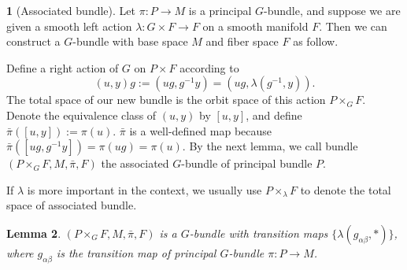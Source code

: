 \documentclass[11pt]{article}
\theoremstyle{definition}
\newtheorem{para}{}[part]
\theoremstyle{plain}
\newtheorem{lem}[para]{Lemma}
\begin{document}
\begin{para}[Associated bundle]\label{11}
	Let $\pi:P\to M$ is a principal $G$-bundle, and suppose we are given a smooth left action $\lambda:G\times F\to F$ on a smooth manifold $F$. Then we can construct a $G$-bundle with base space $M$ and fiber space $F$ as follow.

	Define a right action of $G$ on $P\times F$ according to
	\[
	(u,y)g:=(ug,g^{-1}y)=(ug,\lambda(g^{-1},y)).
	\]
	The total space of our new bundle is the orbit space of this action $P\times_G F$. Denote the equivalence class of $(u,y)$ by $[u,y]$, and define $\bar{\pi}([u,y]):=\pi(u)$. $\bar{\pi}$ is a well-defined map because $\bar{\pi}([ug,g^{-1}y])=\pi(ug)=\pi(u)$. By the next lemma, we call bundle $(P\times_G F,M,\bar{\pi},F)$ the associated $G$-bundle of principal bundle $P$. 
\end{para}

If $\lambda$ is more important in the context, we usually use $P\times_\lambda F$ to denote the total space of associated bundle.

\begin{lem}
	$(P\times_G F,M,\bar{\pi},F)$ is a $G$-bundle with transition maps $\{\lambda(g_{\alpha\beta},*)\}$, where $g_{\alpha\beta}$ is the transition map of principal $G$-bundle $\pi:P\to M$.
\end{lem}
\end{document}
